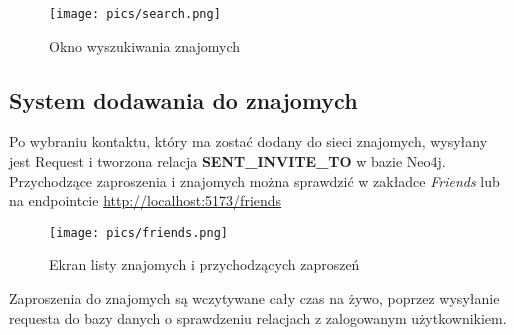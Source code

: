 \documentclass{article}
\begin{document}
\begin{figure}[h]
    \centering
    \texttt{[image: pics/search.png]}
    \caption*{Okno wyszukiwania znajomych}
\end{figure}

\newpage
\subsection{System dodawania do znajomych}
Po wybraniu kontaktu, który ma zostać dodany do sieci znajomych, wysyłany jest Request i tworzona relacja \textbf{SENT\_INVITE\_TO} w bazie Neo4j. Przychodzące zaproszenia i znajomych można sprawdzić w zakładce \textit{Friends} lub na endpointcie \url{http://localhost:5173/friends}

\begin{figure}[h]
    \centering
    \texttt{[image: pics/friends.png]}
    \caption*{Ekran listy znajomych i przychodzących zaproszeń}
\end{figure}

Zaproszenia do znajomych są wczytywane cały czas na żywo, poprzez wysyłanie requesta do bazy danych o sprawdzeniu relacjach z zalogowanym użytkownikiem. 
\end{document}
